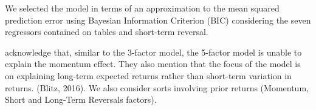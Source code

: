 \documentclass[a4paper]{article}
\begin{document}
	We selected the model in terms of an approximation to the mean squared prediction error using Bayesian Information Criterion (BIC) \citet*{Schwarz1978} considering the seven regressors contained on tables and short-term reversal. 
	
	\citet*{fama2016} acknowledge that, similar to the 3-factor model, the 5-factor model is unable to explain the momentum effect. They also mention that the focus of the model is on explaining long-term expected returns rather than short-term variation in returns. (Blitz, 2016). We also consider sorts involving prior returns (Momentum, Short and Long-Term Reversals factors).
	
	
	
	
\end{document}
